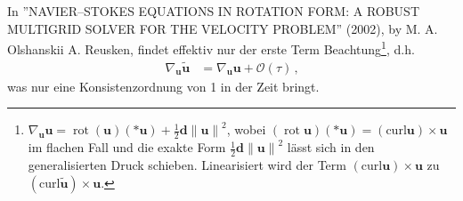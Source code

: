 \documentclass[a4paper,11pt]{scrartcl}
\newcommand{\U}{u} %
\newcommand{\Ub}{\mathbf{\U}} %
\newcommand{\tU}{\tilde{u}} %
\newcommand{\tUb}{\mathbf{\tU}} %
\newcommand{\landau}{\mathcal{O}}
\newcommand{\rot}{\operatorname{rot}} %
\newcommand{\exd}{\mathbf{d}} %
\newcommand{\formComma}{\,\text{,}}
\begin{document}
In ''NAVIER–STOKES EQUATIONS IN ROTATION FORM: A ROBUST
MULTIGRID SOLVER FOR THE VELOCITY PROBLEM'' (2002),  by M. A. Olshanskii
A. Reusken, findet effektiv nur der erste Term Beachtung\footnote{\( \nabla_{\Ub}\Ub = \rot(\Ub)(*\Ub) + \frac{1}{2}\exd\left\| \Ub \right\|^{2} \),
wobei \( (\rot\Ub)(*\Ub) = \left( \text{curl}\Ub \right)\times\Ub \) im flachen Fall und die exakte Form \( \frac{1}{2}\exd\left\| \Ub \right\|^{2} \)
lässt sich in den generalisierten Druck schieben.
Linearisiert wird der Term \( \left( \text{curl}\Ub \right)\times\Ub \) zu \( \left( \text{curl}\tUb \right)\times\Ub \).},
d.h.
\begin{align}
  \nabla_{\Ub}\tUb &= \nabla_{\Ub}\Ub + \landau\left( \tau \right)\formComma
\end{align}
was nur eine Konsistenzordnung von 1 in der Zeit bringt.
\end{document}

